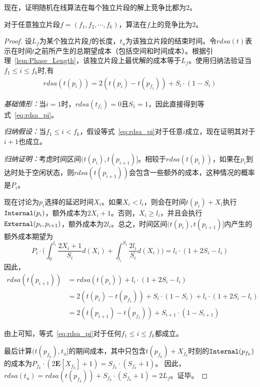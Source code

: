 现在，证明随机在线算法\ralgo 在每个独立片段的解上竞争比都为$2$。
\begin{theorem}
    对于任意独立片段$f= (f_1, f_2, \cdots, f_k)$，算法\ralgo 在$f$上的竞争比为$2$。
\end{theorem}

\begin{proof}
设$L_f$为某个独立片段$f$的长度，$t_u$为该独立片段的结束时间。令$rdsa(t)$表示\ralgo 在时间$t$之前所产生的总期望成本（包括空间和时间成本）。根据引理~\ref{lem:Phase_Length}，该独立片段上最优解的成本等于$L_f$。使用归纳法验证当$f_1 \leq i \leq f_k$时,有
\begin{align}
rdsa(t(p_i))=2(t(p_i)-t(p_{f_1}))+S_i\cdot (1-S_i) \label{eq:rdsa_pi} 
\end{align}

\textsl{基础情形：}当$i=1$时，$rdsa(t_{f_1})=0$且$S_1=1$，因此直接得到等式~\ref{eq:rdsa_pi}。

\textsl{归纳假设：}当$f_1 \leq i < f_k$，假设等式~\ref{eq:rdsa_pi}对于任意$i$成立，现在证明其对于$i+1$也成立。

\textsl{归纳证明：}考虑时间区间$(t(p_i),t(p_{i+1})]$。相较于$rdsa(t(p_i))$，如果\ralgo 在$p_i$到达时处于空闲状态，则$rdsa(t(p_{i+1}))$会包含一些额外的成本，这种情况的概率是$P_i$。

现在讨论\ralgo 为$p_i$选择的延迟时间$X_i$。如果$X_i<l_i$，则\ralgo 会在时间$t(p_i)+X_i$执行$\Inter(p_i)$，额外成本为$2X_i+1$。否则，$X_i \geq l_i$，并且\ralgo 会执行$\Exter(p_i,p_{i+1})$，额外成本为$2l_i$。总之，时间区间$(t(p_i),t(p_{i+1})]$内产生的额外成本期望为
$$
    P_i \cdot \big( \int_{0}^{l_i} \frac{2X_i+1}{S_i}d(X_i) + \int_{l_i}^{S_i} \frac{2l_i}{S_i}d(X_i)\big) = l_i\cdot (1 + 2S_i - l_i)
$$
因此，
\begin{align*}
    rdsa(t(p_{i+1})) &= rdsa(t(p_{i})) + l_i\cdot (1 + 2S_i - l_i) \\
    &= 2(t(p_i)-t(p_{f_1}))+S_i\cdot (1-S_i) + l_i\cdot (1 + 2S_i - l_i)\\
    &=2(t(p_{i+1}) - t(p_{f_1})) + S_{i+1}\cdot (1-S_{i+1})
\end{align*}

由上可知，等式~\ref{eq:rdsa_pi}对于任何$f_1 \leq i \leq f_k$都成立。

最后计算$(t(p_{f_k}), t_u]$的期间成本，其中只包含$t(p_{f_k})+X_{f_k}$时刻的$\Inter(p_{f_k})$的成本为$P_{f_k}\cdot (2\mathbf{E}[X_{f_k}]+1) = S_{f_k}\cdot (S_{f_k}+1)$。
因此，$rdsa(t_u) = rdsa(t(p_{f_k})) + S_{f_k}\cdot (S_{f_k}+1) = 2L_f$。证毕。
\end{proof}



